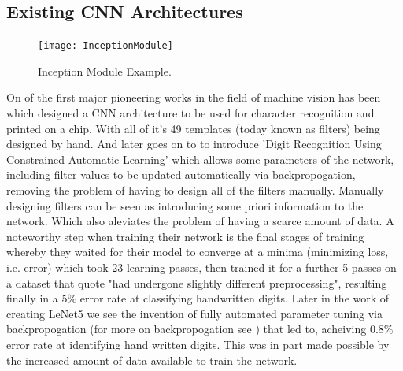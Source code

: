   \subsection{Existing CNN Architectures}
  \par
  \begin{figure}
    \centering
    \texttt{[image: InceptionModule]}
    \caption{\label{fig:InceptionModule}Inception Module Example.}
  \end{figure}

  On of the first major pioneering works in the field of machine vision has been \cite{Cun1989} which designed a CNN architecture to be used for character recognition and printed on a chip. With all of it's 49 templates (today known as filters) being designed by hand. And later goes on to to introduce 'Digit Recognition Using Constrained Automatic Learning' which allows some parameters of the network, including filter values to be updated automatically via backpropogation, removing the problem of having to design all of the filters manually. Manually designing filters can be seen as introducing some priori information to the network. Which also aleviates the problem of having a scarce amount of data. A noteworthy step when training their network is the final stages of training whereby they waited for their model to converge at a minima (minimizing loss, i.e. error) which took 23 learning passes, then trained it for a further 5 passes on a dataset that quote "had undergone slightly different preprocessing", resulting finally in a 5\% error rate at classifying handwritten digits. Later in the work of creating LeNet5 \cite{LeCun1998} we see the invention of fully automated parameter tuning via backpropogation (for more on backpropogation see \cite{CunYannle1988}) that led to, acheiving 0.8\% error rate at identifying hand written digits. This was in part made possible by the increased amount of data available to train the network.
  \par
